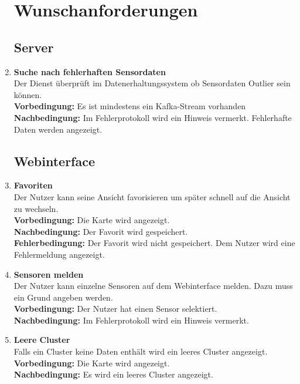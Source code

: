 \begin{enumerate}[label=\textbf{WF\arabic{enumi}0}]
	\setcounter{enumi}{99}
	\section{Wunschanforderungen}
	
	\subsection{Server}
	
	\item \textbf{Suche nach fehlerhaften Sensordaten}\\
	Der Dienst überprüft im Datenerhaltungssystem ob Sensordaten Outlier sein können.\\
	\textbf{Vorbedingung:} Es ist mindestens ein Kafka-Stream vorhanden\\
	\textbf{Nachbedingung:} Im Fehlerprotokoll wird ein Hinweis vermerkt. Fehlerhafte Daten werden angezeigt.\\
		
	\subsection{Webinterface}
	\setcounter{enumi}{199}
	
	\item \textbf{Favoriten}\\
		Der Nutzer kann seine Ansicht favorisieren um später schnell auf die Ansicht zu wechseln.\\
		\textbf{Vorbedingung:} Die Karte wird angezeigt.\\
		\textbf{Nachbedingung:} Der Favorit wird gespeichert.\\
		\textbf{Fehlerbedingung:} Der Favorit wird nicht gespeichert. Dem Nutzer wird eine Fehlermeldung angezeigt.
	
	\item \textbf{Sensoren melden}\\
		Der Nutzer kann einzelne Sensoren auf dem Webinterface melden. Dazu muss ein Grund angeben werden.\\
		\textbf{Vorbedingung:} Der Nutzer hat einen Sensor selektiert.\\
		\textbf{Nachbedingung:} Im Fehlerprotokoll wird ein Hinweis vermerkt.\\
		
	\item \textbf{Leere Cluster}\\
		Falls ein Cluster keine Daten enthält wird ein leeres Cluster angezeigt.\\
		\textbf{Vorbedingung:} Die Karte wird angezeigt.\\
		\textbf{Nachbedingung:} Es wird ein leeres Cluster angezeigt.\\
		

\end{enumerate}
